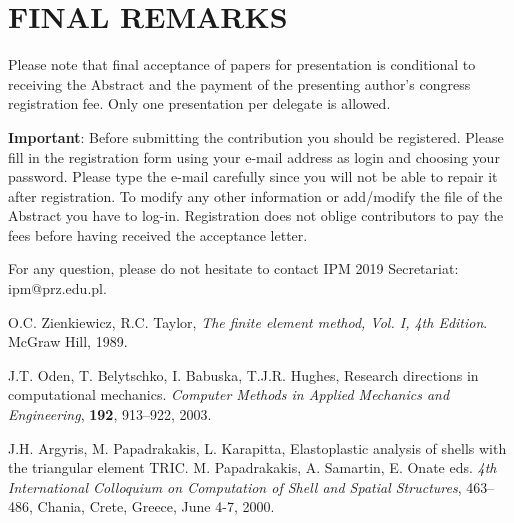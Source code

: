 \documentclass{ShortPaper_Instructions_LaTeX_IPM2019}
\begin{document}
\section{FINAL REMARKS}
\noindent Please note that final acceptance of papers for presentation is conditional to receiving the Abstract and the payment of the presenting author's congress registration fee. Only one presentation per delegate is allowed.

\textbf{Important}: Before submitting the contribution you should be registered. Please fill in the registration form using your e-mail address as login and choosing your password. Please type the e-mail carefully since you will not be able to repair it after registration. To modify any other information or add/modify the file of the Abstract you have to log-in. Registration does not oblige contributors to pay the fees before having received the acceptance letter.

For any question, please do not hesitate to contact IPM 2019 Secretariat: ipm@prz.edu.pl.

\begin{thebibliography}{99}
 O.C. Zienkiewicz, R.C. Taylor,
\textit{The finite element method, Vol. I, 4th Edition}. McGraw Hill, 1989.

 J.T. Oden, T. Belytschko, I. Babuska, T.J.R. Hughes,
Research directions in computational mechanics.
\textit{Computer Methods in Applied Mechanics and Engineering}, \textbf{192}, 913--922, 2003.

 J.H. Argyris, M. Papadrakakis, L. Karapitta,
Elastoplastic analysis of shells with the triangular element TRIC.
M. Papadrakakis, A. Samartin, E. Onate eds.
\textit{4th International Colloquium on Computation of Shell and Spatial Structures}, 463--486,
Chania, Crete, Greece, June 4-7, 2000.

\end{thebibliography}
\end{document}
